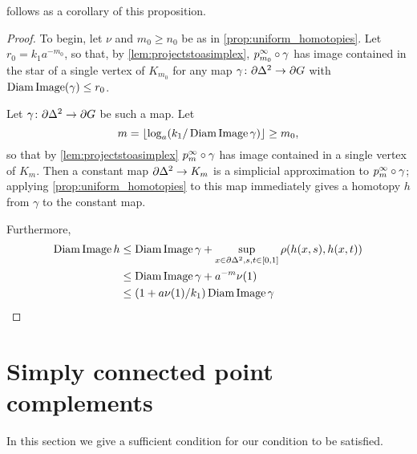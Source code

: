 \documentclass[a4paper]{article}
\begin{document}
 follows as a corollary of this proposition.

\ddagimpliesLCd*

\begin{proof}
  To begin, let $\nu$ and $m_0 \geq n_0$ be as in
  \cref{prop:uniform_homotopies}. Let $r_0 =
  k_1a^{-m_0}$, so that, by \cref{lem:projectstoasimplex},
  $p^\infty_{m_0}\circ\gamma$ has image contained in the star of a single
  vertex of $K_{m_0}$ for any map $\gamma\colon\partial\Delta^2\to\partial
  G$ with $\operatorname{Diam}\operatorname{Image}(\gamma)\leq r_0$.

  Let $\gamma\colon\partial\Delta^2\to\partial G$ be such a map. Let 
  \begin{equation*}
    m = \lfloor\log_a(k_1/\operatorname{Diam}\operatorname{Image}\gamma)\rfloor \geq m_0,
  \end{equation*}
  so that by \cref{lem:projectstoasimplex} $p^\infty_{m}\circ\gamma$ has
  image contained in a single vertex of $K_m$. Then a constant map
  $\partial\Delta^2 \to K_m$ is a simplicial approximation to
  $p^\infty_m\circ\gamma$; applying \cref{prop:uniform_homotopies} to
  this map immediately gives a homotopy $h$ from $\gamma$ to the constant map.

  Furthermore,
  \begin{align*}
    \operatorname{Diam}\operatorname{Image} h &\leq \operatorname{Diam}\operatorname{Image}\gamma + \sup_{x \in\partial\Delta^2, s,t \in [0,1]} \rho(h(x,s), h(x,t)) \\
                  &\leq \operatorname{Diam}\operatorname{Image}\gamma + a^{-m} \nu(1) \\
                  &\leq (1 + a\nu(1)/k_1) \operatorname{Diam}\operatorname{Image}\gamma \qedhere
  \end{align*}
\end{proof}

\section{Simply connected point complements}

In this section we give a sufficient condition for our condition
 to be satisfied.


\end{document}
